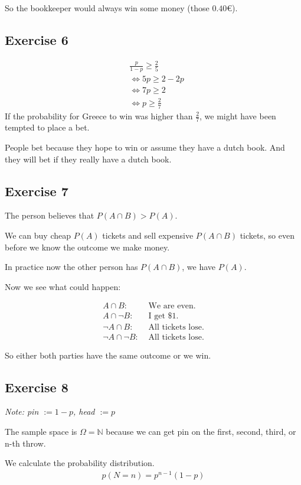 So the bookkeeper would always win some money (those $0.40 \euro$).

\subsection*{Exercise 6}
\begin{align*}
& \frac{p}{1-p} \geq \frac{2}{5}\\
& \Leftrightarrow 5p \geq 2 - 2p\\
& \Leftrightarrow 7p \geq 2\\
& \Leftrightarrow p \geq \frac{2}{7}
\end{align*}
If the probability for Greece to win was higher than $\frac{2}{7}$, we might have been tempted to place a bet.

People bet because they hope to win or assume they have a dutch book. And they will bet if they really have a dutch book.

\subsection*{Exercise 7}
The person believes that $P(A \cap B)>P(A)$.

We can buy cheap $P(A)$ tickets and sell expensive $P(A\cap B)$ tickets, so even before we know the outcome we make money.

In practice now the other person has $P(A \cap B)$, we have $P(A)$.

Now we see what could happen:

\begin{align*}
     A \cap      B:& \mbox{ We are even.}      \\
     A \cap \neg B:& \mbox{ I get \$ 1.}       \\
\neg A \cap      B:& \mbox{ All tickets lose.} \\
\neg A \cap \neg B:& \mbox{ All tickets lose.}
\end{align*}

So either both parties have the same outcome or we win.

\subsection*{Exercise 8}
\textit{Note: pin $:= 1-p$, head $:= p$}

The sample space is $\Omega = \mathbb{N}$ because we can get pin on the first, second, third, or n-th throw.

We calculate the probability distribution.
\begin{align*}
p(N = n) = p^{n - 1} \left( 1 - p \right)
\end{align*}

